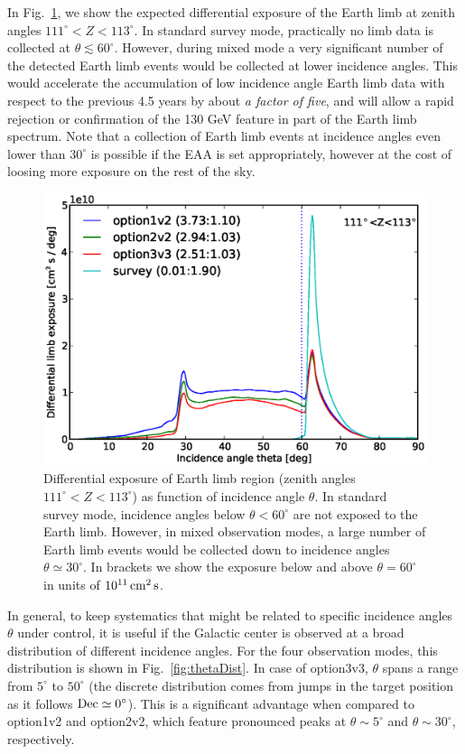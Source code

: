 \documentclass[aps,prd,superscriptaddress,nofootinbib,fixlfloat, 12pt]{revtex4-1}
\begin{document}
In Fig.~\ref{fig:limb_exposure}, we show the expected differential exposure of
the Earth limb at zenith angles $111^\circ<Z<113^\circ$. In standard survey
mode, practically no limb data is collected at $\theta\lesssim60^\circ$.
However, during mixed mode a very significant number of the detected Earth
limb events would be collected at lower incidence angles. This would
accelerate the accumulation of low incidence angle Earth limb data with
respect to the previous 4.5 years by about \emph{a factor of five}, and will
allow a rapid rejection or confirmation of the 130 GeV feature in part of the
Earth limb spectrum. Note that a collection of Earth limb events at incidence
angles even lower than $30^\circ$ is possible if the EAA is set appropriately,
however at the cost of loosing more exposure on the rest of the sky.

\begin{figure}[t]
  \begin{center}
    \includegraphics[width=0.6\linewidth]{plots/limb_exposure.eps}
    \vspace{-0.5cm}
  \end{center}
  \caption{Differential exposure of Earth limb region (zenith angles
    $111^\circ<Z<113^\circ$) as function of incidence angle $\theta$. In
    standard survey mode, incidence angles below $\theta<60^\circ$ are not
    exposed to the Earth limb. However, in mixed observation modes, a
    large number of Earth limb events would be collected down to incidence
    angles $\theta\simeq30^\circ$. In brackets we show the exposure below and
  above $\theta=60^\circ$ in units of $10^{11}\rm\,cm^2\,s$.}
  \label{fig:limb_exposure}
\end{figure}

In general, to keep systematics that might be related to specific incidence
angles $\theta$ under control, it is useful if the Galactic center is observed
at a broad distribution of different incidence angles. For the four
observation modes, this distribution is shown in
Fig.~\ref{fig:thetaDist}. In case of option3v3, $\theta$ spans a range from
$5^\circ$ to $50^\circ$ (the discrete distribution comes from jumps in the
target position as it follows $\rm Dec\simeq0^\circ$). This is a significant
advantage
when compared to option1v2 and option2v2, which feature pronounced peaks at
$\theta\sim5^\circ$ and $\theta\sim30^\circ$, respectively.
\end{document}
